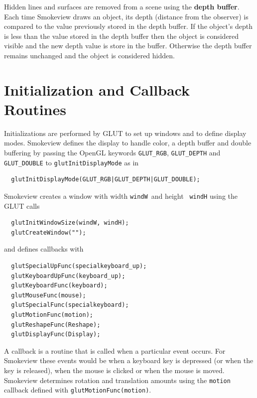 \documentclass[11pt,twoside]{book}
\begin{document}
Hidden lines and surfaces are removed from a scene using the {\bf
depth buffer}.  Each time Smokeview draws an object, its depth
(distance from the observer) is compared to the value previously
stored in the depth buffer.  If the object's depth is less than
the value stored in the depth buffer then the object is considered
visible and the new depth value is store in the buffer. Otherwise
the depth buffer remains unchanged and the object is considered
hidden.

%
%

\section{Initialization and Callback Routines}
Initializations are performed by GLUT to set up windows and to
define display modes.  Smokeview defines the display to handle
color, a depth buffer and double buffering by passing the OpenGL
keywords {\tt GLUT\_RGB}, {\tt GLUT\_DEPTH} and {\tt GLUT\_DOUBLE}
to {\tt glutInitDisplayMode} as in

\begin{lstlisting}
  glutInitDisplayMode(GLUT_RGB|GLUT_DEPTH|GLUT_DOUBLE);
\end{lstlisting}

Smokeview creates a window with width {\tt windW}\ and height {\tt
windH} using the GLUT calls

\begin{lstlisting}
  glutInitWindowSize(windW, windH);
  glutCreateWindow("");
\end{lstlisting}

and defines callbacks with

\begin{lstlisting}
  glutSpecialUpFunc(specialkeyboard_up);
  glutKeyboardUpFunc(keyboard_up);
  glutKeyboardFunc(keyboard);
  glutMouseFunc(mouse);
  glutSpecialFunc(specialkeyboard);
  glutMotionFunc(motion);
  glutReshapeFunc(Reshape);
  glutDisplayFunc(Display);
\end{lstlisting}

A callback is a routine that is called when a particular event
occurs.  For Smokeview these events would be when a keyboard key
is depressed (or when the key is released), when the mouse is
clicked or when the mouse is moved.  Smokeview determines rotation
and translation amounts using the {\tt motion} callback defined
with {\tt glutMotionFunc(motion)}.
\end{document}
